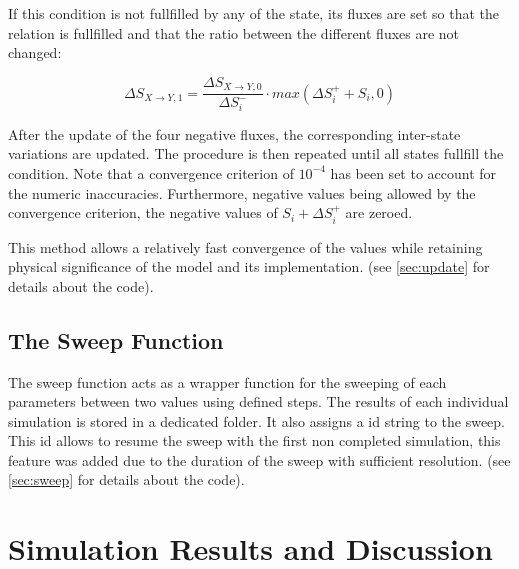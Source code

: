 \documentclass[11pt]{article} %
\begin{document}
If this condition is not fullfilled by any of the state, its fluxes are set so that the relation is fullfilled and that the ratio between the different fluxes are not changed:

\bigskip
\begin{equation} \label{eq:correction}
\Delta S_{X\rightarrow Y,1} = \frac{\Delta S_{X\rightarrow Y,0}}{\Delta S_i^-}\cdot max(\Delta S_i^+ + S_i, 0)
\end{equation}
\bigskip

After the update of the four negative fluxes, the corresponding inter-state variations are updated. The procedure is then repeated until all states fullfill the condition. Note that a convergence criterion of $10^{-4}$ has been set to account for the numeric inaccuracies. Furthermore, negative values being allowed by the convergence criterion, the negative values of $S_i + \Delta S_i^+$ are zeroed.

This method allows a relatively fast convergence of the values while retaining physical significance of the model and its implementation. (see \ref{sec:update} for details about the code).



\subsection{The Sweep Function}\indent

The sweep function acts as a wrapper function for the sweeping of each parameters between two values using defined steps. The results of each individual simulation is stored in a dedicated folder. It also assigns a id string to the sweep. This id allows to resume the sweep with the first non completed simulation, this feature was added due to the duration of the sweep with sufficient resolution. (see \ref{sec:sweep} for details about the code).







\newpage
\section{Simulation Results and Discussion}\indent
\end{document}
